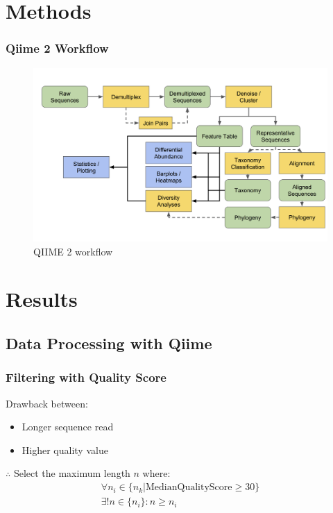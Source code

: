 \documentclass{beamer}
\begin{document}
    \section{Methods}
    \begin{frame}
        \frametitle{Qiime 2 Workflow}

        \begin{figure}
            \includegraphics[width=0.8 \linewidth]{figures/qiime.png}
            \caption{QIIME 2 workflow \protect\cite{qiime1, qiime2, qiime3}}
        \end{figure}
    \end{frame}

    \section{Results}
    \subsection{Data Processing with Qiime}
    \begin{frame}
        \frametitle{Filtering with Quality Score}

        Drawback between:
         \begin{itemize}
            \item Longer sequence read
            \item Higher quality value
        \end{itemize}

        $\therefore$ Select the maximum length $n$ where:
        \begin{equation}
            \begin{array}{c}
                \forall n_i \in \{ n_k | \mbox{MedianQualityScore} \geq 30 \} \\
                \exists ! n \in \{n_i\} : n \geq n_i
            \end{array}
        \end{equation}
    \end{frame}
\end{document}
